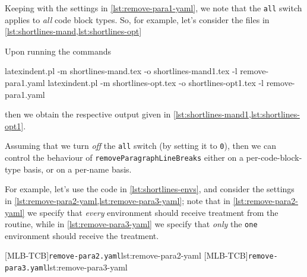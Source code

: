 
	Keeping with the settings in \cref{lst:remove-para1-yaml}, we note that the \texttt{all} switch applies
	to \emph{all} code block types. So, for example, let's consider the files in \cref{lst:shortlines-mand,lst:shortlines-opt}

	\begin{minipage}{.45\linewidth}
	\end{minipage}
	\hfill
	\begin{minipage}{.45\linewidth}
	\end{minipage}

	Upon running the commands
	\begin{widepage}
		\begin{commandshell}
latexindent.pl -m shortlines-mand.tex -o shortlines-mand1.tex -l remove-para1.yaml
latexindent.pl -m shortlines-opt.tex -o shortlines-opt1.tex -l remove-para1.yaml
\end{commandshell}
	\end{widepage}

	then we obtain the respective output given in \cref{lst:shortlines-mand1,lst:shortlines-opt1}.


	Assuming that we turn \emph{off} the \texttt{all} switch (by setting it to \texttt{0}), then
	we can control the behaviour of \texttt{removeParagraphLineBreaks} either on a per-code-block-type basis,
	or on a per-name basis.

	For example, let's use the code in \cref{lst:shortlines-envs}, and consider the settings in \cref{lst:remove-para2-yaml,lst:remove-para3-yaml};
	note that in \cref{lst:remove-para2-yaml} we specify that \emph{every} environment should receive
	treatment from the routine, while in \cref{lst:remove-para3-yaml} we specify that \emph{only} the
	\texttt{one} environment should receive the treatment.

	\begin{minipage}{.45\linewidth}
	\end{minipage}
	\hfill
	\begin{minipage}{.49\linewidth}
		[MLB-TCB]{\texttt{remove-para2.yaml}}{lst:remove-para2-yaml}
		[MLB-TCB]{\texttt{remove-para3.yaml}}{lst:remove-para3-yaml}
	\end{minipage}


